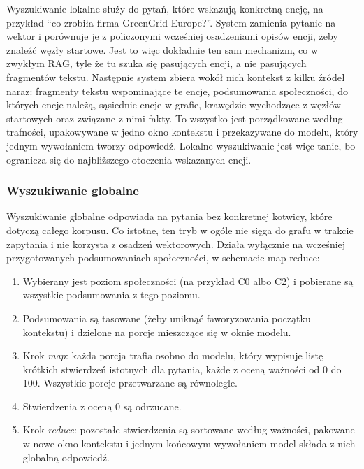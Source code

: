 \documentclass[11pt,a4paper]{article}
\begin{document}
Wyszukiwanie lokalne służy do pytań, które wskazują konkretną encję,
na przykład \enquote{co zrobiła firma GreenGrid Europe?}. System zamienia pytanie na wektor i
porównuje je z policzonymi wcześniej osadzeniami opisów encji, żeby znaleźć węzły startowe.
Jest to więc dokładnie ten sam mechanizm, co w zwykłym RAG, tyle że tu szuka się pasujących
encji, a nie pasujących fragmentów tekstu. Następnie system zbiera wokół
nich kontekst z kilku źródeł naraz: fragmenty tekstu wspominające te encje, podsumowania
społeczności, do których encje należą, sąsiednie encje w grafie, krawędzie wychodzące z
węzłów startowych oraz związane z nimi fakty. To wszystko jest porządkowane według trafności,
upakowywane w jedno okno kontekstu i przekazywane do modelu, który jednym wywołaniem tworzy
odpowiedź. Lokalne wyszukiwanie jest więc tanie, bo ogranicza się do najbliższego otoczenia
wskazanych encji.

\subsubsection{Wyszukiwanie globalne}

Wyszukiwanie globalne odpowiada na pytania bez konkretnej kotwicy,
które dotyczą całego korpusu. Co istotne, ten tryb w ogóle nie sięga do grafu w trakcie
zapytania i nie korzysta z osadzeń wektorowych. Działa wyłącznie na wcześniej przygotowanych
podsumowaniach społeczności, w schemacie map-reduce:

\begin{enumerate}[itemsep=2pt]
  \item Wybierany jest poziom społeczności (na przykład C0 albo C2) i pobierane są wszystkie
        podsumowania z tego poziomu.
  \item Podsumowania są tasowane (żeby uniknąć faworyzowania początku kontekstu) i dzielone
        na porcje mieszczące się w oknie modelu.
  \item Krok \textit{map}: każda porcja trafia osobno do modelu, który wypisuje listę
        krótkich stwierdzeń istotnych dla pytania, każde z oceną ważności od 0 do 100.
        Wszystkie porcje przetwarzane są równolegle.
  \item Stwierdzenia z oceną 0 są odrzucane.
  \item Krok \textit{reduce}: pozostałe stwierdzenia są sortowane według ważności, pakowane
        w nowe okno kontekstu i jednym końcowym wywołaniem model składa z nich globalną
        odpowiedź.
\end{enumerate}
\end{document}
